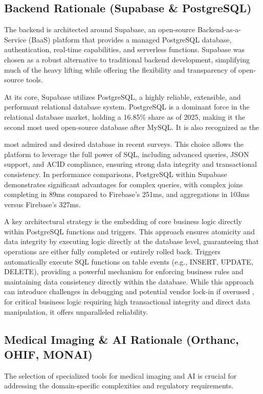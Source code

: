 \subsection{Backend Rationale (Supabase \& PostgreSQL)}
The backend is architected around Supabase, an open-source Backend-as-a-Service (BaaS) platform that provides a managed PostgreSQL database, authentication, real-time capabilities, and serverless functions. Supabase was chosen as a robust alternative to traditional backend development, simplifying much of the heavy lifting while offering the flexibility and transparency of open-source tools. 

At its core, Supabase utilizes PostgreSQL, a highly reliable, extensible, and performant relational database system. PostgreSQL is a dominant force in the relational database market, holding a 16.85\% share as of 2025, making it the second most used open-source database after MySQL. It is also recognized as the

most admired and desired database in recent surveys. This choice allows the platform to leverage the full power of SQL, including advanced queries, JSON support, and ACID compliance, ensuring strong data integrity and transactional consistency. In performance comparisons, PostgreSQL within Supabase demonstrates significant advantages for complex queries, with complex joins completing in 89ms compared to Firebase's 251ms, and aggregations in 103ms versus Firebase's 327ms. 

A key architectural strategy is the embedding of core business logic directly within PostgreSQL functions and triggers. This approach ensures atomicity and data integrity by executing logic directly at the database level, guaranteeing that operations are either fully completed or entirely rolled back. Triggers automatically execute SQL functions on table events (e.g., INSERT, UPDATE, DELETE), providing a powerful mechanism for enforcing business rules and maintaining data consistency directly within the database. While this approach can introduce challenges in debugging and potential vendor lock-in if overused , for critical business logic requiring high transactional integrity and direct data manipulation, it offers unparalleled reliability. 

\subsection{Medical Imaging \& AI Rationale (Orthanc, OHIF, MONAI)}
The selection of specialized tools for medical imaging and AI is crucial for addressing the domain-specific complexities and regulatory requirements.

